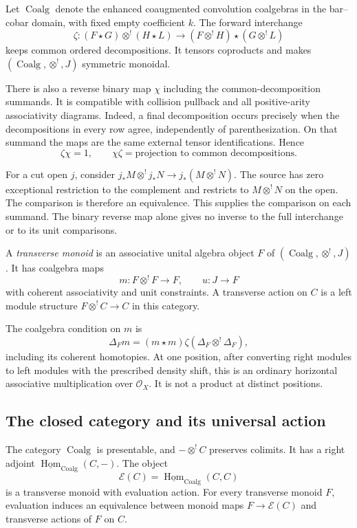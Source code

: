 Let $\operatorname{Coalg}$
denote the enhanced coaugmented
convolution coalgebras in the
bar--cobar domain, with fixed
empty coefficient $k$.
The forward interchange
\[
 \zeta:(F\star G)\otimes^!(H\star L)
 \longrightarrow
 (F\otimes^!H)\star(G\otimes^!L)
\]
keeps common ordered decompositions.
It tensors coproducts and makes
$(\operatorname{Coalg},\otimes^!,J)$
symmetric monoidal.

There is also a reverse
binary map $\chi$ including
the common-decomposition
summands. It is compatible
with collision pullback
and all positive-arity
associativity diagrams.
Indeed, a final decomposition
occurs precisely when the
decompositions in every row
agree, independently of
parenthesization. On that
summand the maps are the
same external tensor
identifications. Hence
\[
 \zeta\chi=1,\qquad
 \chi\zeta=\text{projection to common decompositions}.
\]

For a cut open $j$, consider
$j_*M\otimes^!j_*N\to j_*(M\otimes^!N)$.
The source has zero exceptional restriction to the complement
and restricts to $M\otimes^!N$ on the open.
The comparison is therefore an equivalence. This supplies
the comparison on
each summand.
The binary reverse
map alone gives
no inverse to the
full interchange
or to its unit
comparisons.

\begin{definition}\label{v4-arith:centers:def:transverse}
A \emph{transverse monoid}
is an associative unital
algebra object $F$ of
$(\operatorname{Coalg},\otimes^!,J)$.
It has coalgebra maps
\[
 m:F\otimes^!F\to F,\qquad u:J\to F
\]
with coherent associativity
and unit constraints.
A transverse action on
$C$ is a left module
structure
$F\otimes^!C\to C$
in this category.
\end{definition}

The coalgebra condition
on $m$ is
\[
 \Delta_Fm
 =(m\star m)\zeta
       (\Delta_F\otimes^!\Delta_F),
\]
including its coherent
homotopies. At one
position, after converting
right modules to left
modules with the prescribed
density shift, this is
an ordinary horizontal
associative multiplication
over $\mathcal O_X$.
It is not a product
at distinct positions.

\subsection{The closed category and its universal action}
\label{v4-arith:centers:subsec:closed-transverse}

\begin{theorem}\label{v4-arith:centers:thm:transverse-closed}
The category
$\operatorname{Coalg}$
is presentable, and
$-\otimes^!C$ preserves
colimits. It has a
right adjoint
$\underline{\operatorname{Hom}}_{\operatorname{Coalg}}(C,-)$.
The object
\[
 \mathcal E(C)=
 \underline{\operatorname{Hom}}_{\operatorname{Coalg}}(C,C)
\]
is a transverse monoid
with evaluation action.
For every transverse
monoid $F$, evaluation
induces an equivalence
between monoid maps
$F\to\mathcal E(C)$
and transverse actions
of $F$ on $C$.
\end{theorem}

